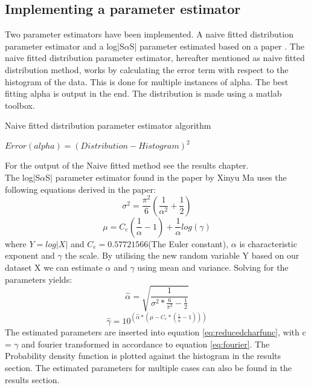 \subsection{Implementing a parameter estimator}
Two parameter estimators have been implemented. A naive fitted distribution parameter estimator and a log|S$\alpha$S| parameter estimated based on a paper
\cite{XinyuMa1995}. The naive fitted distribution parameter estimator, hereafter mentioned as naive fitted distribution method, works by calculating the error term with respect to the histogram of the data. This is done for multiple instances of alpha. The best fitting alpha is output in the end. The distribution is made using a matlab toolbox\cite{stbltoolbox}.
\begin{algorithm}[H]
\caption{Naive fitted distribution parameter estimator algorithm}
\begin{algorithmic}
\State $ Error(alpha) = (Distribution - Histogram)^2$
\EndFor
{}
\end{algorithmic}
\end{algorithm}
For the output of the Naive fitted method see the results chapter.\\

The log|S$\alpha$S| parameter estimator found in the paper by Xinyu Ma\cite{XinyuMa1995} uses the following equations derived in the paper:
\begin{equation}
\sigma^2 = \frac{\pi^2}{6}(\frac{1}{\alpha^2} + \frac{1}{2})
\end{equation}
\begin{equation}
\mu = C_e ( \frac{1}{\alpha} - 1) + \frac{1}{\alpha} log(\gamma)
\end{equation}
where $Y = log|X|$ and $C_e=0.57721566$(The Euler constant), $\alpha$ is characteristic exponent and $\gamma$ the scale. By utilising the new random variable Y based on our dataset X we can estimate $\alpha$ and $\gamma$ using mean and variance. Solving for  the parameters yields:
\begin{equation}
\hat{\alpha} = \sqrt{\frac{1}{\sigma^2 * \frac{6}{\pi^2} -\frac{1}{2}}}
\end{equation}
\begin{equation}
\hat{\gamma} = 10^{(\hat{\alpha} * ( \mu - C_e * ( \frac{1}{\hat{\alpha}} - 1) ) )}
\end{equation}
The estimated parameters are inserted into equation \ref{eq:reducedcharfunc}, with c = $\gamma$ and fourier transformed in accordance to equation \ref{eq:fourier}. The Probability density function is plotted against the histogram in the results section. The estimated parameters for multiple cases can also be found in the results section.
